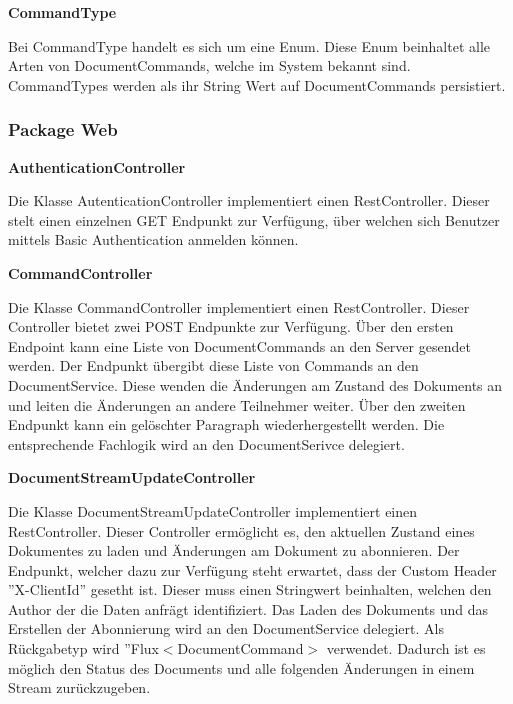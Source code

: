 \textbf{CommandType}

Bei CommandType handelt es sich um eine Enum.
Diese Enum beinhaltet alle Arten von DocumentCommands, welche im System bekannt sind.
CommandTypes werden als ihr String Wert auf DocumentCommands persistiert.


\subsubsection{Package Web}

\textbf{AuthenticationController}

Die Klasse AutenticationController implementiert einen RestController.
Dieser stelt einen einzelnen GET Endpunkt zur Verfügung, über welchen sich Benutzer mittels Basic Authentication anmelden können.

\textbf{CommandController}

Die Klasse CommandController implementiert einen RestController.
Dieser Controller bietet zwei POST Endpunkte zur Verfügung.
Über den ersten Endpoint kann eine Liste von DocumentCommands an den Server gesendet werden.
Der Endpunkt übergibt diese Liste von Commands an den DocumentService.
Diese wenden die Änderungen am Zustand des Dokuments an und leiten die Änderungen an andere Teilnehmer weiter.
Über den zweiten Endpunkt kann ein gelöschter Paragraph wiederhergestellt werden.
Die entsprechende Fachlogik wird an den DocumentSerivce delegiert.

\textbf{DocumentStreamUpdateController}

Die Klasse DocumentStreamUpdateController implementiert einen RestController.
Dieser Controller ermöglicht es, den aktuellen Zustand eines Dokumentes zu laden und Änderungen am Dokument zu abonnieren.
Der Endpunkt, welcher dazu zur Verfügung steht erwartet, dass der Custom Header ''X-ClientId'' gesetht ist.
Dieser muss einen Stringwert beinhalten, welchen den Author der die Daten anfrägt identifiziert.
Das Laden des Dokuments und das Erstellen der Abonnierung wird an den DocumentService delegiert.
Als Rückgabetyp wird ''Flux$<$DocumentCommand$>$ verwendet.
Dadurch ist es möglich den Status des Documents und alle folgenden Änderungen in einem Stream zurückzugeben.

